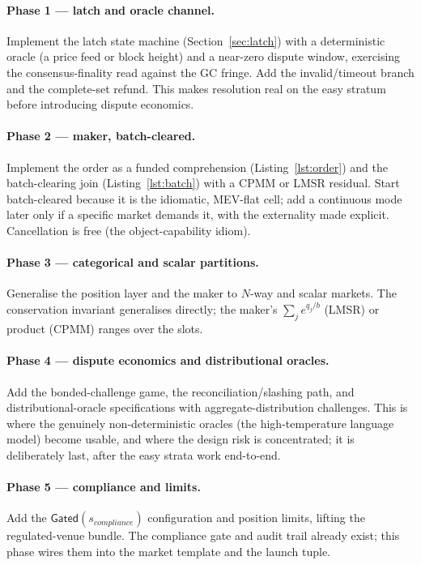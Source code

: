 \documentclass[11pt]{article}
\begin{document}
\paragraph{Phase 1 --- latch and oracle channel.} Implement the latch state machine
(Section~\ref{sec:latch}) with a deterministic oracle (a price feed or block height) and a
near-zero dispute window, exercising the consensus-finality read against the GC fringe. Add the
invalid/timeout branch and the complete-set refund. This makes resolution real on the easy
stratum before introducing dispute economics.

\paragraph{Phase 2 --- maker, batch-cleared.} Implement the order as a funded comprehension
(Listing~\ref{lst:order}) and the batch-clearing join (Listing~\ref{lst:batch}) with a CPMM or
LMSR residual. Start batch-cleared because it is the idiomatic, MEV-flat cell; add a continuous
mode later only if a specific market demands it, with the externality made explicit. Cancellation
is free (the object-capability idiom).

\paragraph{Phase 3 --- categorical and scalar partitions.} Generalise the position layer and the
maker to $N$-way and scalar markets. The conservation invariant generalises directly; the maker's
$\sum_j e^{q_j/b}$ (LMSR) or product (CPMM) ranges over the slots.

\paragraph{Phase 4 --- dispute economics and distributional oracles.} Add the bonded-challenge
game, the reconciliation/slashing path, and distributional-oracle specifications with
aggregate-distribution challenges. This is where the genuinely non-deterministic oracles (the
high-temperature language model) become usable, and where the design risk is concentrated; it is
deliberately last, after the easy strata work end-to-end.

\paragraph{Phase 5 --- compliance and limits.} Add the $\mathsf{Gated}(s_{\mathit{compliance}})$
configuration and position limits, lifting the regulated-venue bundle. The compliance gate and
audit trail already exist; this phase wires them into the market template and the launch tuple.
\end{document}
